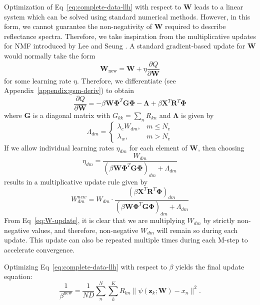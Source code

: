 Optimization of Eq~\ref{eq:complete-data-llh} with respect to $\mathbf{W}$ leads
to a linear system which can be solved using standard numerical methods.
However, in this form, we cannot guarantee the non-negativity of $\mathbf{W}$
required to describe reflectance spectra. Therefore, we take inspiration from
the multiplicative updates for NMF introduced by Lee and Seung \cite{nmf-orig}.
A standard gradient-based update for $\mathbf{W}$ would normally take the form
\begin{equation}
    \mathbf{W}_{\text{new}} = \mathbf{W} + \eta\frac{\partial Q}{\partial \mathbf{W}}
\end{equation}
for some learning rate $\eta$. Therefore, we differentiate (see
Appendix~\ref{appendix:gsm-deriv}) to obtain
\begin{equation}
    \frac{\partial Q}{\partial \mathbf{W}} = -\beta \mathbf{W}\mathbf{\Phi}^T\mathbf{G}\mathbf{\Phi} - \mathbf{\Lambda} + \beta \mathbf{X}^T\mathbf{R}^T\mathbf{\Phi}
\end{equation}
where $\mathbf{G}$ is a diagonal matrix with $G_{kk} = \sum_n R_{kn}$ and
$\mathbf{\Lambda}$ is given by
\begin{equation}
    \Lambda_{dm} = \begin{cases}
        \lambda_e W_{dm}, & m \leq N_v \\
        \lambda_w, & m > N_v
    \end{cases}
\end{equation}
If we allow individual learning rates $\eta_{dm}$ for each element of
$\mathbf{W}$, then choosing
\begin{equation}
    \eta_{dm} = \frac{W_{dm}}{\left(\beta \mathbf{W}\mathbf{\Phi}^T\mathbf{G}\mathbf{\Phi}\right)_{dm} + \Lambda_{dm}}
\end{equation}
results in a multiplicative update rule given by
\begin{equation}\label{eq:W-update}
    W_{dm}^{new}  = W_{dm} \cdot \dfrac{\left(\beta \mathbf{X}^T\mathbf{R}^T\mathbf{\Phi}\right)_{dm}}{\left(\beta \mathbf{W}\mathbf{\Phi}^T\mathbf{G}\mathbf{\Phi}\right)_{dm} + \Lambda_{dm}}
\end{equation}
From Eq~\ref{eq:W-update}, it is clear that we are multiplying $W_{dm}$ by
strictly non-negative values, and therefore, non-negative $W_{dm}$ will remain
so during each update. This update can also be repeated multiple times during
each M-step to accelerate convergence.

Optimizing Eq~\ref{eq:complete-data-llh} with respect to $\beta$ yields the final update equation:
\begin{equation}\label{eq:beta-update}
    \frac{1}{\beta^{\text{new}}}  = \frac{1}{ND}\sum\limits_n^N\sum\limits_k^K R_{kn}\lVert \psi(\mathbf{z}_k; \mathbf{W}) - x_n \rVert^2.
\end{equation}

